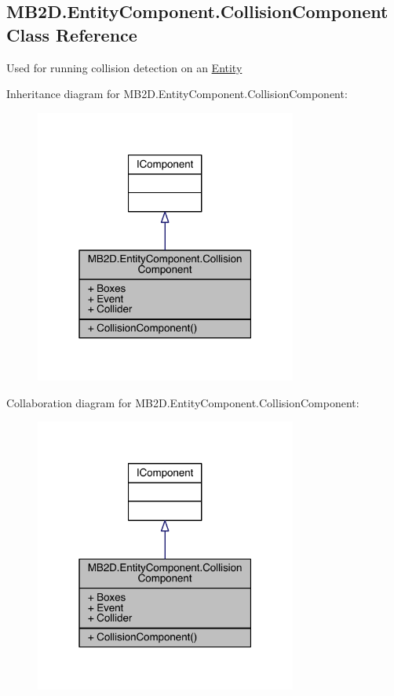 \hypertarget{class_m_b2_d_1_1_entity_component_1_1_collision_component}{}\subsection{M\+B2\+D.\+Entity\+Component.\+Collision\+Component Class Reference}
\label{class_m_b2_d_1_1_entity_component_1_1_collision_component}


Used for running collision detection on an \hyperlink{class_m_b2_d_1_1_entity_component_1_1_entity}{Entity}  




Inheritance diagram for M\+B2\+D.\+Entity\+Component.\+Collision\+Component\+:
\nopagebreak
\begin{figure}[H]
\begin{center}
\leavevmode
\includegraphics[width=244pt]{class_m_b2_d_1_1_entity_component_1_1_collision_component__inherit__graph}
\end{center}
\end{figure}


Collaboration diagram for M\+B2\+D.\+Entity\+Component.\+Collision\+Component\+:
\nopagebreak
\begin{figure}[H]
\begin{center}
\leavevmode
\includegraphics[width=244pt]{class_m_b2_d_1_1_entity_component_1_1_collision_component__coll__graph}
\end{center}
\end{figure}
